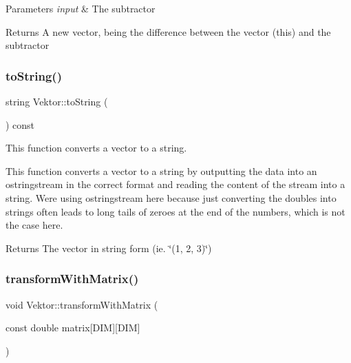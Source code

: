 \begin{DoxyParams}{Parameters}
{\em input} & The subtractor\\
\hline
\end{DoxyParams}
\begin{DoxyReturn}{Returns}
A new vector, being the difference between the vector (this) and the subtractor 
\end{DoxyReturn}
\mbox{\label{class_vektor_abcc349a76c74b8464efaedddfec94a04}} 
\subsubsection{\texorpdfstring{to\+String()}{toString()}}
{\footnotesize\ttfamily string Vektor\+::to\+String (\begin{DoxyParamCaption}{ }\end{DoxyParamCaption}) const}



This function converts a vector to a string. 

This function converts a vector to a string by outputting the data into an ostringstream in the correct format and reading the content of the stream into a string. We\textquotesingle{}re using ostringstream here because just converting the doubles into strings often leads to long tails of zeroes at the end of the numbers, which is not the case here.

\begin{DoxyReturn}{Returns}
The vector in string form (ie. \char`\"{}(1, 2, 3)\char`\"{}) 
\end{DoxyReturn}
\mbox{\label{class_vektor_a5769002268e6bfa05c33b10839420cc2}} 
\subsubsection{\texorpdfstring{transform\+With\+Matrix()}{transformWithMatrix()}}
{\footnotesize\ttfamily void Vektor\+::transform\+With\+Matrix (\begin{DoxyParamCaption}\item[{const double}]{matrix\mbox{[}\+D\+I\+M\mbox{]}\mbox{[}\+D\+I\+M\mbox{]} }\end{DoxyParamCaption})}



